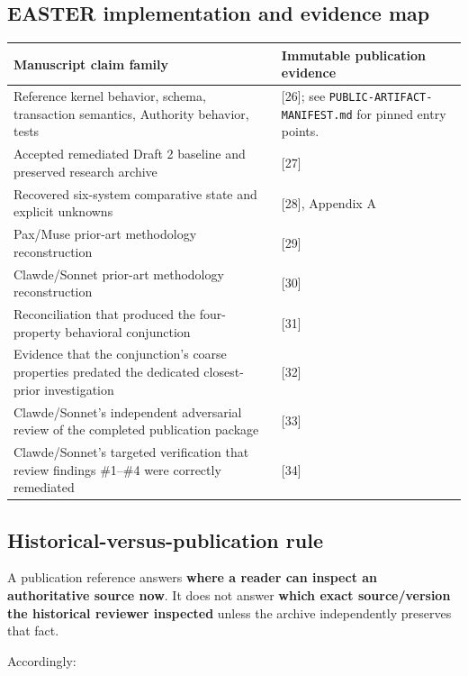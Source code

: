 \documentclass[11pt]{article}
\begin{document}
\subsection{EASTER implementation and evidence map}

\begin{table}[htbp]
\centering
\small
\begin{tabularx}{\textwidth}{X X}
\toprule
Manuscript claim family & Immutable publication evidence \\
\midrule
Reference kernel behavior, schema, transaction semantics, Authority behavior, tests & [26]; see \texttt{PUBLIC-ARTIFACT-MANIFEST.md} for pinned entry points. \\
Accepted remediated Draft 2 baseline and preserved research archive & [27] \\
Recovered six-system comparative state and explicit unknowns & [28], Appendix A \\
Pax/Muse prior-art methodology reconstruction & [29] \\
Clawde/Sonnet prior-art methodology reconstruction & [30] \\
Reconciliation that produced the four-property behavioral conjunction & [31] \\
Evidence that the conjunction's coarse properties predated the dedicated closest-prior investigation & [32] \\
Clawde/Sonnet's independent adversarial review of the completed publication package & [33] \\
Clawde/Sonnet's targeted verification that review findings \#1--\#4 were correctly remediated & [34] \\
\bottomrule
\end{tabularx}
\end{table}


\subsection{Historical-versus-publication rule}

A publication reference answers \textbf{where a reader can inspect an authoritative source now}. It does not answer \textbf{which exact source/version the historical reviewer inspected} unless the archive independently preserves that fact.

Accordingly:
\end{document}
